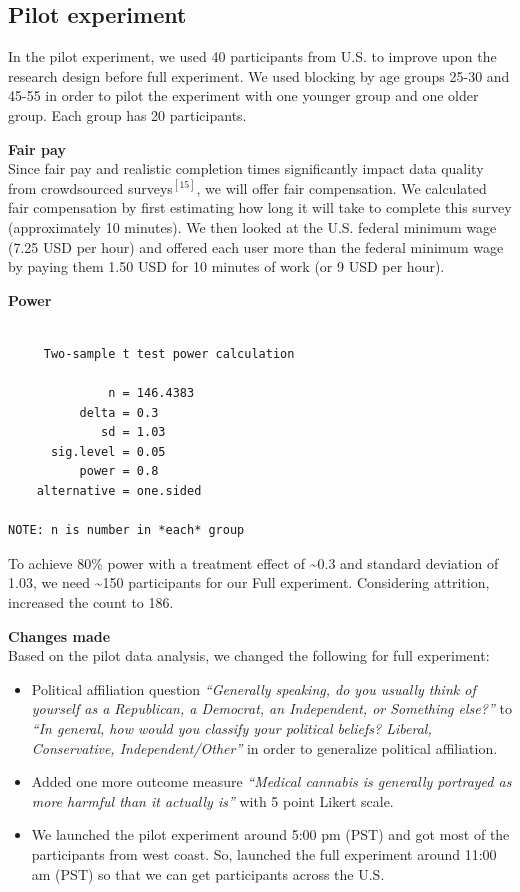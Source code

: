 \documentclass[
]{article}
\providecommand{\tightlist}{%
  \setlength{\itemsep}{0pt}\setlength{\parskip}{0pt}}
\begin{document}
\hypertarget{pilot-experiment}{%
\subsection{Pilot experiment}\label{pilot-experiment}}

In the pilot experiment, we used 40 participants from U.S. to improve
upon the research design before full experiment. We used blocking by age
groups 25-30 and 45-55 in order to pilot the experiment with one younger
group and one older group. Each group has 20 participants.

\textbf{Fair pay}\\
Since fair pay and realistic completion times significantly impact data
quality from crowdsourced surveys\(^{[15]}\), we will offer fair
compensation. We calculated fair compensation by first estimating how
long it will take to complete this survey (approximately 10 minutes). We
then looked at the U.S. federal minimum wage (7.25 USD per hour) and
offered each user more than the federal minimum wage by paying them 1.50
USD for 10 minutes of work (or 9 USD per hour).

\textbf{Power}

\begin{verbatim}

     Two-sample t test power calculation 

              n = 146.4383
          delta = 0.3
             sd = 1.03
      sig.level = 0.05
          power = 0.8
    alternative = one.sided

NOTE: n is number in *each* group
\end{verbatim}

To achieve 80\% power with a treatment effect of \textasciitilde0.3 and
standard deviation of 1.03, we need \textasciitilde150 participants for
our Full experiment. Considering attrition, increased the count to 186.

\textbf{Changes made}\\
Based on the pilot data analysis, we changed the following for full
experiment:

\begin{itemize}
\tightlist
\item
  Political affiliation question \emph{``Generally speaking, do you
  usually think of yourself as a Republican, a Democrat, an Independent,
  or Something else?''} to \emph{``In general, how would you classify
  your political beliefs? Liberal, Conservative, Independent/Other''} in
  order to generalize political affiliation.
\item
  Added one more outcome measure \emph{``Medical cannabis is generally
  portrayed as more harmful than it actually is''} with 5 point Likert
  scale.
\item
  We launched the pilot experiment around 5:00 pm (PST) and got most of
  the participants from west coast. So, launched the full experiment
  around 11:00 am (PST) so that we can get participants across the U.S.
\end{itemize}
\end{document}
